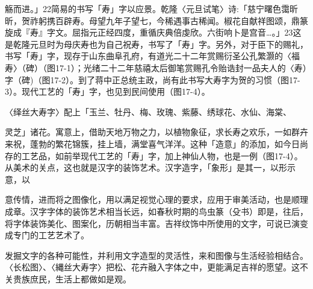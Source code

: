 

\noindent 觞而进。」22简易的书写「寿」字以应景。乾隆〈元旦试笔〉诗:「慈宁曙色霭昕昕，贺祚躬携百辟寿。母望九年子望七，今稀遇事古稀闻。椒花自献祥图颂，鼎篆旋成『寿』字文。屈指元正经四度，重循庆典倍虔欣。六街响卜是宫音…。」23这是乾隆元旦时为母庆寿也为自己祝寿，书写了「寿」字。另外，对于臣下的赐礼，书写「寿」字，现存于山东曲阜孔府，有道光二十二年赏赐衍圣公孔繁灏的〈福寿〉（碑）（图17-1）；光绪二十二年慈禧太后御笔赏赐孔令贻诰封一品夫人的〈寿）字（碑)（图17-2）。到了蒋中正总统主政，尚有此书写大寿字为贺的习惯（图17-3）。现代工艺的「寿」字，也见到民间使用（图17-4）。


\begin{BookQuote}
〈绎丝大寿字〉配上「玉兰、牡丹、梅、玫瑰、紫藤、绣球花、水仙、海棠、
\end{BookQuote}

灵芝」诸花。寓意上，借助天地万物之力，以植物象征，求长寿之欢乐，一如群卉来祝，蓬勃的繁花锦簇，挂上墙，满堂喜气洋洋。这种「造意」的添加，如今日尚存的工艺品，如前举现代工艺的「寿」字，加上神仙人物，也是一例（图17-4）。从美术的关点，这也就是汉字的装饰艺术。汉字造字，「象形」是其一，以形示意，以

\vfill
\begin{BookNotes}
\end{BookNotes}


\noindent 意传情，进而将之图像化，用以满足视觉心理的要求，应用于审美活动，也是顺理成章。汉字字体的装饰艺术相当长远，如春秋时期的鸟虫篆（殳书）即是，往后，将字体装饰美化、图案化，历朝相当丰富。吉祥纹饰中所使用的文字，可说已演变成专门的工艺艺术了。

发掘文字的各种可能性，并利用文字造型的灵活性，来和图像与生活经验相结合。〈长松图〉、〈縄丝大寿字〉把松、花卉融入字体之中，更能满足吉祥的愿望。这不关贵族庶民，生活上都做如是观。
